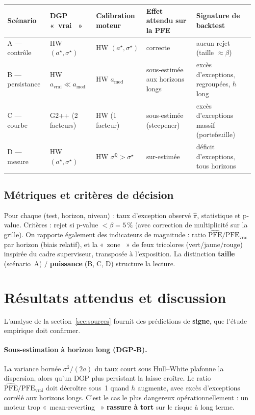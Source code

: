 \documentclass[11pt,a4paper]{article}
\providecommand{\og}{«~}
\providecommand{\fg}{~»}
\newcommand{\PFE}{\mathrm{PFE}}
\newcommand{\Qmeas}{\mathbb{Q}}
\theoremstyle{remark}
\begin{document}
\begin{table}[h]
\centering
\small
\renewcommand{\arraystretch}{1.3}
\begin{tabularx}{\linewidth}{@{}l l l X l@{}}
\toprule
\textbf{Scénario} & \textbf{DGP \og vrai \fg} & \textbf{Calibration moteur} & \textbf{Effet attendu sur la PFE} & \textbf{Signature de backtest} \\
\midrule
A --- contrôle & HW $(a^\star,\sigma^\star)$ & HW $(a^\star,\sigma^\star)$ & correcte & aucun rejet (taille $\approx\beta$) \\
B --- persistance & HW $a_{\text{vrai}}\!\ll\! a_{\text{mod}}$ & HW $a_{\text{mod}}$ & sous-estimée aux horizons longs & excès d'exceptions, regroupées, $h$ long \\
C --- courbe & G2++ (2 facteurs) & HW (1 facteur) & sous-estimée (steepener) & excès d'exceptions massif (portefeuille) \\
D --- mesure & HW $(a^\star,\sigma^\star)$ & HW $\sigma^{\Qmeas}>\sigma^\star$ & sur-estimée & déficit d'exceptions, tous horizons \\
\bottomrule
\end{tabularx}
\end{table}

\subsection{Métriques et critères de décision}

Pour chaque (test, horizon, niveau) : taux d'exception observé $\hat\pi$, statistique et p-value. Critères : rejet si p-value $< \beta = 5\,\%$ (avec correction de multiplicité sur la grille). On rapporte également des indicateurs de magnitude : ratio $\widehat{\PFE}/\PFE_{\text{vrai}}$ par horizon (biais relatif), et la \og zone \fg{} de feux tricolores (vert/jaune/rouge) inspirée du cadre superviseur, transposée à l'exposition. La distinction \textbf{taille} (scénario~A) / \textbf{puissance} (B, C, D) structure la lecture.

\section{Résultats attendus et discussion}
\label{sec:resultats}

L'analyse de la section~\ref{sec:sources} fournit des prédictions de \textbf{signe}, que l'étude empirique doit confirmer.

\paragraph{Sous-estimation à horizon long (DGP-B).} La variance bornée $\sigma^2/(2a)$ du taux court sous Hull--White plafonne la dispersion, alors qu'un DGP plus persistant la laisse croître. Le ratio $\widehat{\PFE}/\PFE_{\text{vrai}}$ doit décroître sous~1 quand $h$ augmente, avec excès d'exceptions corrélé aux horizons longs. C'est le cas le plus dangereux opérationnellement : un moteur trop \og mean-reverting \fg{} \textbf{rassure à tort} sur le risque à long terme.
\end{document}
